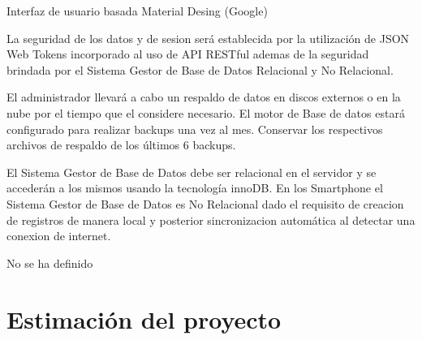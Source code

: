          Interfaz de usuario basada Material Desing (Google)
        
         La seguridad de los datos y de sesion será establecida por la utilización de JSON Web Tokens incorporado al uso de API RESTful ademas de la seguridad brindada por el Sistema Gestor de Base de Datos Relacional y No Relacional.

        
        El administrador llevará a cabo un respaldo de datos en discos externos o en la nube por el tiempo que el considere necesario. El motor de Base de datos estará configurado para realizar backups una vez al mes. Conservar los
        respectivos archivos de respaldo de los últimos 6 backups.
        
        
        El Sistema Gestor de Base de Datos debe ser relacional en el servidor y se accederán a los mismos usando la tecnología innoDB.
        En los Smartphone el Sistema Gestor de Base de Datos es No Relacional dado el requisito de creacion de registros de manera local y posterior sincronizacion automática al detectar una conexion de internet. 
        
        
        No se ha definido

\section{Estimación del proyecto}
